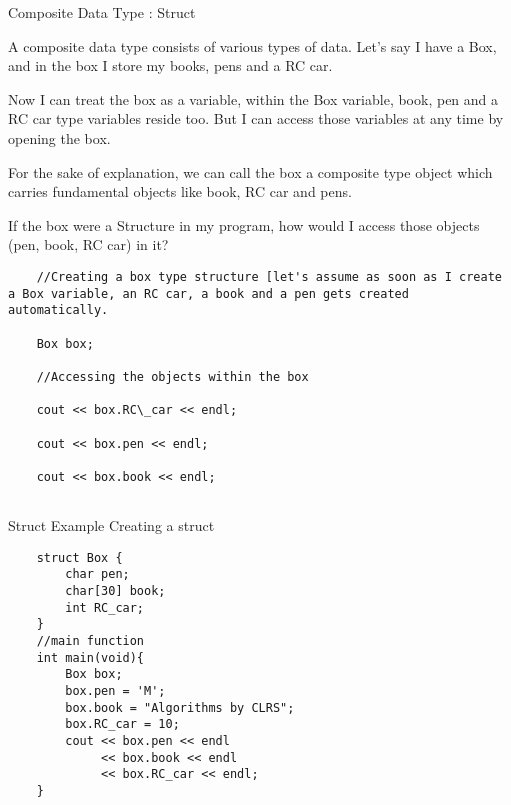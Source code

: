 \documentclass[newPxFont]{beamer}
\begin{document}
\begin{frame}[allowframebreaks]{Composite Data Type : Struct}

A composite data type consists of various types of data. Let's say I have a \alert{Box}, and in the box I store my books, pens and a RC car. 

Now I can treat the box as a variable, within the \alert{Box} variable, book, pen and a RC car type variables reside too. But I can access those variables at any time by opening the box. 

For the sake of explanation, we can call the box a composite type object which carries fundamental objects like book, RC car and pens.

\vspace{2em}

\begin{exampleblock}{If the box were a \alert{Structure} in my program, how would I access those objects (pen, book, RC car) in it?}

\begin{verbatim}
    //Creating a box type structure [let's assume as soon as I create a Box variable, an RC car, a book and a pen gets created automatically. 

    Box box;
    
    //Accessing the objects within the box
    
    cout << box.RC\_car << endl;
    
    cout << box.pen << endl;
    
    cout << box.book << endl;
    
\end{verbatim}

\end{exampleblock}


\end{frame}

\begingroup
{}

\begin{frame}{Struct Example}
Creating a \alert{struct}
\begin{verbatim}
    struct Box {
        char pen;
        char[30] book;
        int RC_car;
    }
    //main function
    int main(void){
        Box box;
        box.pen = 'M';
        box.book = "Algorithms by CLRS";
        box.RC_car = 10;
        cout << box.pen << endl 
             << box.book << endl
             << box.RC_car << endl;
    }
\end{verbatim}

\end{frame}
\end{document}
